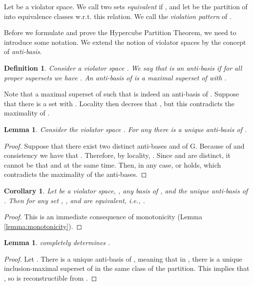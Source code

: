 \documentclass[12pt]{article}
\newtheorem{lemma2}[theorem2]{Lemma}
\newenvironment{lemma}{\begin{lemma2}}{\end{lemma2}}
\newtheorem{corollary2}[theorem2]{Corollary}
\newenvironment{corollary}{\begin{corollary2}}{\end{corollary2}}
\newtheorem{definition2}[theorem2]{Definition}
\newenvironment{definition}{\begin{definition2}}{\end{definition2}}
\theoremstyle{remark}
\begin{document}
 Let  be a violator space. We call two sets  \emph{equivalent}
 if , and let  be the partition of  into
 equivalence classes w.r.t. this relation. We call  the \emph{violation pattern}
 of .
 

Before we formulate and prove the Hypercube Partition Theorem, we need to introduce some 
notation. We extend the notion of violator spaces by the concept of \emph{anti-basis}.

\begin{definition}
Consider a violator space . We say that  is an \emph{anti-basis} if
for all proper supersets  we have .
An anti-basis of  is a maximal superset  of  with . 
 \end{definition}
 
 Note that a maximal superset  of  such that  is 
indeed 
 an anti-basis of . Suppose that there is a set  with
 . Locality then decrees that , but this contradicts the maximality of .
 
 \begin{lemma}
 \label{lemma:uniqueantibasis}
Consider  the violator space . For any  there is a unique
 anti-basis  of .  
 \end{lemma}

 \begin{proof}
 Suppose that there exist two distinct anti-bases  and  of G.
 Because of  and consistency we have that
 .
 Therefore, by locality, .
 Since  and  are distinct, it cannot be that
   and 
  at the same time. Then, in any case,  or 
  holds, which contradicts the maximality of the anti-bases.
   \end{proof}
   
   \begin{corollary}
   Let  be a violator space, ,  any basis of , and 
   the unique anti-basis of . Then for any set , , 
   and  are equivalent, i.e., .
   \end{corollary}
   \begin{proof}
   This is an immediate consequence of monotonicity (Lemma \ref{lemma:monotonicity}).
   \end{proof}

\begin{lemma}
\label{lemma:patterndetspace}
 completely determines .
\end{lemma}

\begin{proof} Let . There is a unique anti-basis
 of , meaning that in , there is a unique
inclusion-maximal superset of  in the same class of the partition.
This implies that , so
 is reconstructible from .
\end{proof}
\end{document}
